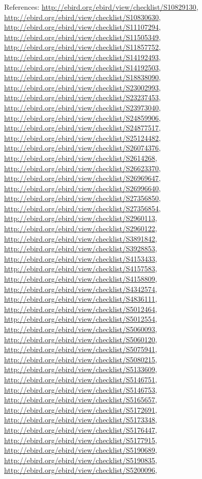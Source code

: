 \documentclass[9pt, article]{memoir}
\begin{document}
\begin{multicols}{2}
References: 
\url{http://ebird.org/ebird/view/checklist/S10829130}, 
\url{http://ebird.org/ebird/view/checklist/S10830630}, 
\url{http://ebird.org/ebird/view/checklist/S11107294}, 
\url{http://ebird.org/ebird/view/checklist/S11505349}, 
\url{http://ebird.org/ebird/view/checklist/S11857752}, 
\url{http://ebird.org/ebird/view/checklist/S14192493}, 
\url{http://ebird.org/ebird/view/checklist/S14192503}, 
\url{http://ebird.org/ebird/view/checklist/S18838090}, 
\url{http://ebird.org/ebird/view/checklist/S23002993}, 
\url{http://ebird.org/ebird/view/checklist/S23237453}, 
\url{http://ebird.org/ebird/view/checklist/S23973040}, 
\url{http://ebird.org/ebird/view/checklist/S24859906}, 
\url{http://ebird.org/ebird/view/checklist/S24877517}, 
\url{http://ebird.org/ebird/view/checklist/S25124482}, 
\url{http://ebird.org/ebird/view/checklist/S26074376}, 
\url{http://ebird.org/ebird/view/checklist/S2614268}, 
\url{http://ebird.org/ebird/view/checklist/S26623370}, 
\url{http://ebird.org/ebird/view/checklist/S26969647}, 
\url{http://ebird.org/ebird/view/checklist/S26996640}, 
\url{http://ebird.org/ebird/view/checklist/S27356850}, 
\url{http://ebird.org/ebird/view/checklist/S27356854}, 
\url{http://ebird.org/ebird/view/checklist/S2960113}, 
\url{http://ebird.org/ebird/view/checklist/S2960122}, 
\url{http://ebird.org/ebird/view/checklist/S3891842}, 
\url{http://ebird.org/ebird/view/checklist/S3928853}, 
\url{http://ebird.org/ebird/view/checklist/S4153433}, 
\url{http://ebird.org/ebird/view/checklist/S4157583}, 
\url{http://ebird.org/ebird/view/checklist/S4158809}, 
\url{http://ebird.org/ebird/view/checklist/S4342574}, 
\url{http://ebird.org/ebird/view/checklist/S4836111}, 
\url{http://ebird.org/ebird/view/checklist/S5012464}, 
\url{http://ebird.org/ebird/view/checklist/S5012554}, 
\url{http://ebird.org/ebird/view/checklist/S5060093}, 
\url{http://ebird.org/ebird/view/checklist/S5060120}, 
\url{http://ebird.org/ebird/view/checklist/S5075941}, 
\url{http://ebird.org/ebird/view/checklist/S5080215}, 
\url{http://ebird.org/ebird/view/checklist/S5133609}, 
\url{http://ebird.org/ebird/view/checklist/S5146751}, 
\url{http://ebird.org/ebird/view/checklist/S5146753}, 
\url{http://ebird.org/ebird/view/checklist/S5165657}, 
\url{http://ebird.org/ebird/view/checklist/S5172691}, 
\url{http://ebird.org/ebird/view/checklist/S5173348}, 
\url{http://ebird.org/ebird/view/checklist/S5176447}, 
\url{http://ebird.org/ebird/view/checklist/S5177915}, 
\url{http://ebird.org/ebird/view/checklist/S5190689}, 
\url{http://ebird.org/ebird/view/checklist/S5190835}, 
\url{http://ebird.org/ebird/view/checklist/S5200096}, 

\end{multicols}
\end{document}
